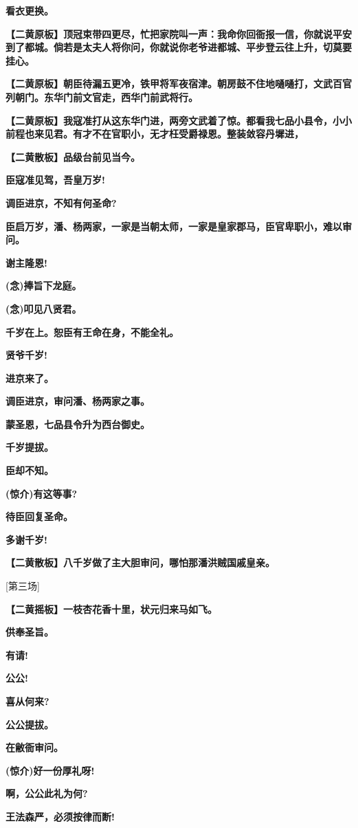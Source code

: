 \textbf{看衣更换。}

\textbf{【二黄原板】顶冠束带四更尽，忙把家院叫一声：我命你回衙报一信，你就说平安到了都城。倘若是太夫人将你问，你就说你老爷进都城、平步登云往上升，切莫要挂心。}

\textbf{【二黄原板】朝臣待漏五更冷，铁甲将军夜宿津。朝房鼓不住地嗵嗵打，文武百官列朝门。东华门前文官走，西华门前武将行。}

\textbf{【二黄原板】我寇准打从这东华门进，两旁文武着了惊。都看我七品小县令，小小前程也来见君。有才不在官职小，无才枉受爵禄恩。整装敛容丹墀进，}

\textbf{【二黄散板】品级台前见当今。}

\textbf{臣寇准见驾，吾皇万岁!}

\textbf{调臣进京，不知有何圣命?}

\textbf{臣启万岁，潘、杨两家，一家是当朝太师，一家是皇家郡马，臣官卑职小，难以审问。}

\textbf{谢主隆恩!}

\textbf{(念)捧旨下龙庭。}

\textbf{(念)叩见八贤君。}

\textbf{千岁在上。恕臣有王命在身，不能全礼。}

\textbf{贤爷千岁!}

\textbf{进京来了。}

\textbf{调臣进京，审问潘、杨两家之事。}

\textbf{蒙圣恩，七品县令升为西台御史。}

\textbf{千岁提拔。}

\textbf{臣却不知。}

\textbf{(惊介)有这等事?}

\textbf{待臣回复圣命。}

\textbf{多谢千岁!}

\textbf{【二黄散板】八千岁做了主大胆审问，哪怕那潘洪贼国戚皇亲。}

{[}第三场{]}

\textbf{【二黄摇板】一枝杏花香十里，状元归来马如飞。}

\textbf{供奉圣旨。}

\textbf{有请!}

\textbf{公公!}

\textbf{喜从何来?}

\textbf{公公提拔。}

\textbf{在敝衙审问。}

\textbf{(惊介)好一份厚礼呀!}

\textbf{啊，公公此礼为何?}

\textbf{王法森严，必须按律而断!}

